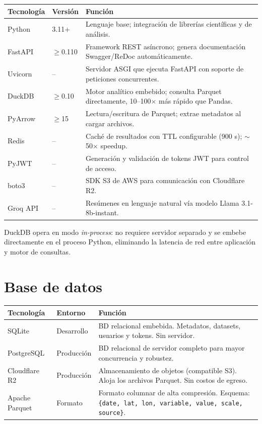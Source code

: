 \begin{center}
\small
\begin{tabular}{@{}llp{5.8cm}@{}}
\toprule
\textbf{Tecnología} & \textbf{Versión} & \textbf{Función} \\
\midrule
Python   & 3.11+      & Lenguaje base; integración de librerías científicas y de análisis. \\
FastAPI  & $\geq$0.110 & Framework REST asíncrono; genera documentación Swagger/ReDoc automáticamente. \\
Uvicorn  & --         & Servidor ASGI que ejecuta FastAPI con soporte de peticiones concurrentes. \\
DuckDB   & $\geq$0.10  & Motor analítico embebido; consulta Parquet directamente, 10--100$\times$ más rápido que Pandas. \\
PyArrow  & $\geq$15    & Lectura/escritura de Parquet; extrae metadatos al cargar archivos. \\
Redis    & --         & Caché de resultados con TTL configurable (900 s); $\sim$50$\times$ speedup. \\
PyJWT    & --         & Generación y validación de tokens JWT para control de acceso. \\
boto3    & --         & SDK S3 de AWS para comunicación con Cloudflare R2. \\
Groq API & --         & Resúmenes en lenguaje natural vía modelo Llama 3.1-8b-instant. \\
\bottomrule
\end{tabular}
\end{center}

\begin{remark}
DuckDB opera en modo \textit{in-process}: no requiere servidor separado y se embebe directamente en el proceso Python, eliminando la latencia de red entre aplicación y motor de consultas.
\end{remark}

\section{Base de datos}
\label{sec:db_tech}

\begin{center}
\small
\begin{tabular}{@{}llp{5.8cm}@{}}
\toprule
\textbf{Tecnología} & \textbf{Entorno} & \textbf{Función} \\
\midrule
SQLite         & Desarrollo  & BD relacional embebida. Metadatos, datasets, usuarios y tokens. Sin servidor. \\
PostgreSQL     & Producción  & BD relacional de servidor completo para mayor concurrencia y robustez. \\
Cloudflare R2  & Producción  & Almacenamiento de objetos (compatible S3). Aloja los archivos Parquet. Sin costos de egreso. \\
Apache Parquet & Formato     & Formato columnar de alta compresión. Esquema: \texttt{\{date, lat, lon, variable, value, scale, source\}}. \\
\bottomrule
\end{tabular}
\end{center}

